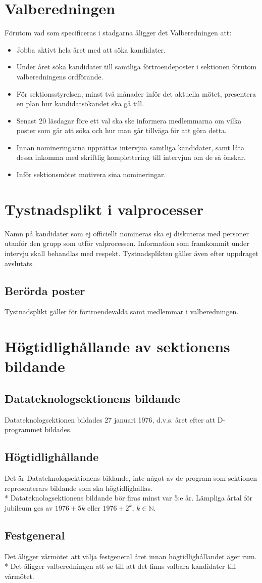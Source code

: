 \documentclass{datateknologsektionen-document}
\begin{document}
\section{Valberedningen}
\label{val}
Förutom vad som specificeras i stadgarna åligger det Valberedningen att:
\begin{itemize}
  \item Jobba aktivt hela året med att söka kandidater.
  \item Under året söka kandidater till samtliga förtroendeposter i sektionen förutom valberedningens ordförande.
  \item För sektionsstyrelsen, minst två månader inför det aktuella mötet, presentera en plan hur kandidatsökandet ska gå till.
  \item Senast 20 läsdagar före ett val ska ske informera medlemmarna om vilka poster som går att söka och hur man går tillväga för att göra detta.
  \item Innan nomineringarna upprättas intervjua samtliga kandidater, samt låta dessa inkomma med skriftlig komplettering till intervjun om de så önskar.
  \item Inför sektionsmötet motivera sina nomineringar.
\end{itemize}
\section{Tystnadsplikt i valprocesser}
Namn på kandidater som ej officiellt nomineras ska ej diskuteras med personer utanför den grupp
som utför valprocessen. Information som framkommit under intervju skall behandlas med respekt.
Tystnadsplikten gäller även efter uppdraget avslutats.
\subsection{Berörda poster}
Tystnadsplikt gäller för förtroendevalda samt medlemmar i valberedningen.
\section{Högtidlighållande av sektionens bildande}
\subsection{Datateknologsektionens bildande}
Datateknologsektionen bildades 27 januari 1976, d.v.s. året efter att D-programmet bildades.

\subsection{Högtidlighållande}
Det är Datateknologsektionens bildande, inte något av de program som sektionen representerars
bildande som ska högtidlighållas.\\*
Datateknologsektionens bildande bör firas minst var 5:e år. Lämpliga årtal för jubileum ges av \(1976
+ 5k\) eller \(1976 + 2^k\), \(k \in \mathbb{N}\).
\subsection{Festgeneral}
\label{hogtid}
Det åligger vårmötet att välja festgeneral året innan högtidlighållandet äger rum.\\*
Det åligger valberedningen att se till att det finns valbara kandidater till vårmötet.
\end{document}
